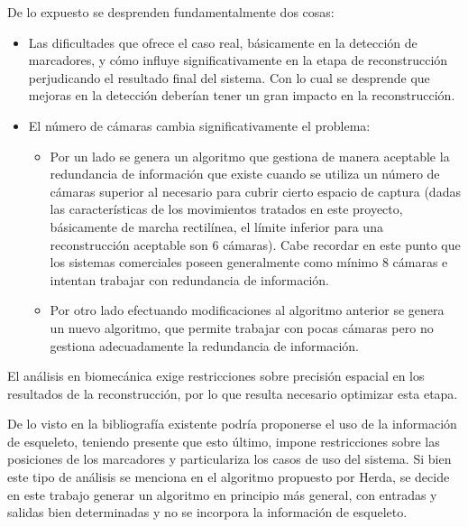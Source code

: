 De lo expuesto se desprenden fundamentalmente dos cosas:
\begin{itemize}
\item Las dificultades que ofrece el caso real, básicamente en la detección de marcadores, y cómo influye significativamente en la etapa de reconstrucción perjudicando el resultado final del sistema. Con lo cual se desprende que mejoras en la detección deberían tener un gran impacto en la reconstrucción.
\item El número de cámaras cambia significativamente el problema:
\vspace{-0.3cm}
\begin{itemize}
\item Por un lado se genera un algoritmo que gestiona de manera aceptable la redundancia de información que existe cuando se utiliza un número de cámaras superior al necesario para cubrir cierto espacio de captura (dadas las características de los movimientos tratados en este proyecto, básicamente de marcha rectilínea, el límite inferior para una reconstrucción aceptable son 6 cámaras). Cabe recordar en este punto que los sistemas comerciales poseen generalmente como mínimo 8 cámaras e intentan trabajar con redundancia de información.
\item Por otro lado efectuando modificaciones al algoritmo anterior se genera un nuevo algoritmo, que permite trabajar con pocas cámaras pero no gestiona adecuadamente la redundancia de información.
\end{itemize}  
\end{itemize} 

El análisis en biomecánica exige restricciones sobre precisión espacial en los resultados de la reconstrucción, por lo que resulta necesario optimizar esta etapa. 

De lo visto en la bibliografía existente podría proponerse el uso de la información de esqueleto, teniendo presente que esto último, impone restricciones sobre las posiciones de los marcadores y particulariza los casos de uso del sistema. Si bien este tipo de análisis se menciona en el algoritmo propuesto por Herda, se decide en este trabajo generar un algoritmo en principio más general, con entradas y salidas bien determinadas y no se incorpora la información de esqueleto. \\
 
 
 
